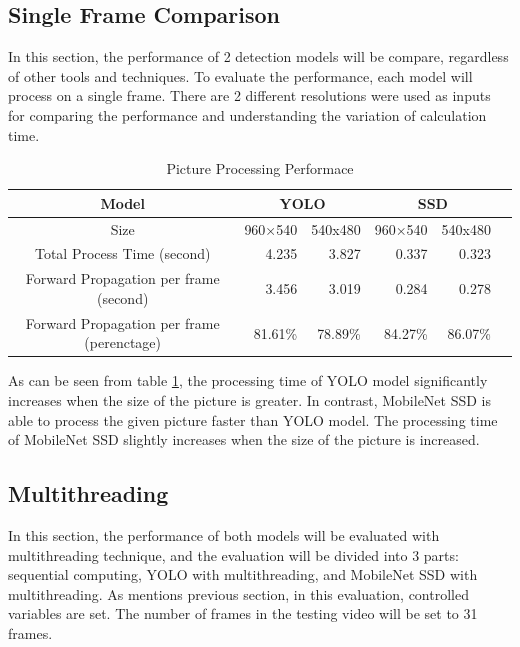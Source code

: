         \subsection{Single Frame Comparison}
            In this section, the performance of 2 detection models will be compare, regardless of other tools and techniques.
            To evaluate the performance, each model will process on a single frame.
            There are 2 different resolutions were used as inputs for comparing the performance and understanding the variation of calculation time.

            \begin{table}[!htp]\centering
                \scriptsize
                \begin{tabular}{lrrrrrr}\toprule
                    \multicolumn{2}{c}{Model} &\multicolumn{2}{c}{YOLO} &\multicolumn{2}{c}{SSD} \\\midrule
                    \multicolumn{2}{c}{Size} &960×540 &540x480 &960×540 &540x480 \\
                    \multicolumn{2}{c}{Total Process Time (second)} &4.235 &3.827 &0.337 &0.323 \\
                    \multicolumn{2}{c}{Forward Propagation per frame (second)} &3.456 &3.019 &0.284 &0.278 \\
                    \multicolumn{2}{c}{Forward Propagation per frame (perenctage)} &81.61\% &78.89\% &84.27\% &86.07\% \\
                    \bottomrule
                \end{tabular}

                \caption{Picture Processing Performace}\label{performance:picture}
            \end{table}

            As can be seen from table \ref{performance:picture}, the processing time of YOLO model significantly increases when the size of the picture is greater.
            In contrast, MobileNet SSD is able to process the given picture faster than YOLO model.
            The processing time of MobileNet SSD slightly increases when the size of the picture is increased.

        \subsection{Multithreading}

            In this section, the performance of both models will be evaluated with multithreading technique,
            and the evaluation will be divided into 3 parts: sequential computing, YOLO with multithreading, and MobileNet SSD with multithreading.
            As mentions previous section, in this evaluation, controlled variables are set.
            The number of frames in the testing video will be set to 31 frames.

